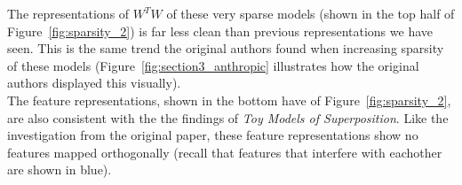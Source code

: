 \documentclass{article} %
\begin{document}
The representations of $W^{T}W$ of these very sparse models (shown in the top
half of Figure~\ref{fig:sparsity_2}) is far less clean than previous
representations we have seen. This is the same trend the original authors
found when increasing sparsity of these models (Figure~\ref{fig:section3_anthropic}
illustrates how the original authors displayed this visually). \\

The feature representations, shown in the bottom have of Figure~\ref{fig:sparsity_2},
are also consistent with the the findings of \textit{Toy Models of Superposition}.
Like the investigation from the original paper, these feature representations 
show no features mapped orthogonally (recall that features that interfere with
eachother are shown in blue).



\end{document}
